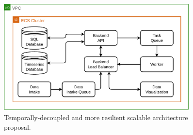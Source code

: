 \begin{figure}[!htbp]
    \centering
    \includegraphics[width=0.90\textwidth]{img/diagrams/pdf/new-arch-queues.drawio.pdf}
    \caption[Temporally-Decoupled and more Resilient Architecture]{Temporally-decoupled and more resilient scalable architecture proposal.}
    \label{fig:new-arch-queues}
\end{figure}
